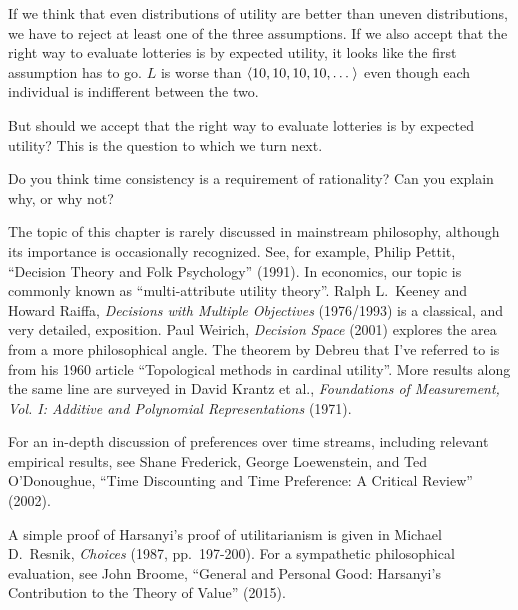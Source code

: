 If we think that even distributions of utility are better than uneven
distributions, we have to reject at least one of the three assumptions. If we
also accept that the right way to evaluate lotteries is by expected utility, it
looks like the first assumption has to go. $L$ is worse than
$\t{10,10,10,10,\ldots}$ even though each individual is indifferent between the
two.

But should we accept that the right way to evaluate lotteries is by
expected utility? This is the question to which we turn next.


\begin{essay}
  Do you think time consistency is a requirement of rationality? Can you
  explain why, or why not?
\end{essay}

\begin{sources}

  The topic of this chapter is rarely discussed in mainstream philosophy,
  although its importance is occasionally recognized. See, for example, Philip
  Pettit, ``Decision Theory and Folk Psychology'' (1991). In economics, our
  topic is commonly known as ``multi-attribute utility theory''. Ralph L.\
  Keeney and Howard Raiffa, \emph{Decisions with Multiple Objectives}
  (1976/1993) is a classical, and very detailed, exposition. Paul Weirich,
  \emph{Decision Space} (2001) explores the area from a more philosophical
  angle. The theorem by Debreu that I've referred to is from his 1960 article
  ``Topological methods in cardinal utility''. More results along the same line
  are surveyed in David Krantz et al., \emph{Foundations of Measurement, Vol. I:
    Additive and Polynomial Representations} (1971).

  For an in-depth discussion of preferences over time streams, including
  relevant empirical results, see Shane Frederick, George Loewenstein, and Ted
  O'Donoughue, ``Time Discounting and Time Preference: A Critical Review''
  (2002).

  A simple proof of Harsanyi's proof of utilitarianism is given in Michael D.\
  Resnik, \emph{Choices} (1987, pp.~197-200). For a sympathetic philosophical
  evaluation, see John Broome, ``General and Personal Good: Harsanyi's
  Contribution to the Theory of Value'' (2015).
  
\end{sources}



